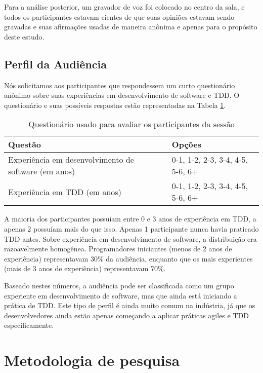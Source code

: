 Para a análise posterior, um gravador de voz foi colocado no centro
da sala, e todos os participantes estavam cientes de que suas opiniões
estavam sendo gravadas e suas afirmações usadas de maneira anônima e apenas
para o propósito deste estudo.

\subsection{Perfil da Audiência}
\label{motiv:sec:participants}

Nós solicitamos aos participantes que respondessem um curto questionário anônimo
sobre suas experiências em desenvolvimento de software e TDD.
O questionário e suas possíveis respostas estão representadas
na Tabela \ref{motiv:questionnaire}.

\begin{center}
\begin{table}[h]
\centering
\begin{tabular}{ | p{5.5cm} || p{5.5cm} | }
\hline
Questão & Opções
\\ \hline \hline
Experiência em desenvolvimento de software (em anos) &
0-1, 1-2, 2-3, 3-4, 4-5, 5-6, 6+\hspace{0.1cm}
\\ \hline
Experiência em TDD (em anos) &
0-1, 1-2, 2-3, 3-4, 4-5, 5-6, 6+
\\ \hline
\end{tabular}
\caption{Questionário usado para avaliar os participantes da sessão}
\label{motiv:questionnaire}
\end{table}
\end{center}

A maioria dos participantes possuíam entre 0 e 3 anos de experiência em TDD,
a apenas 2 possuíam mais do que isso. Apenas 1 participante nunca havia
praticado TDD antes.
Sobre experiência em desenvolvimento de software, a distribuição era
razoavelmente homogênea. Programadores iniciantes (menos de 2 anos de experiência)
representavam 30\% da audiência, enquanto que os mais experientes (mais de 3 anos de experiência)
representavam 70\%.

Baseado nestes números, a audiência pode ser classificada como um grupo
experiente em desenvolvimento de software, mas que ainda está iniciando
a prática de TDD. Este tipo de perfil é ainda muito comum na indústria,
já que os desenvolvedores ainda estão apenas começando a aplicar práticas
agiles e TDD especificamente.

\section{Metodologia de pesquisa}

